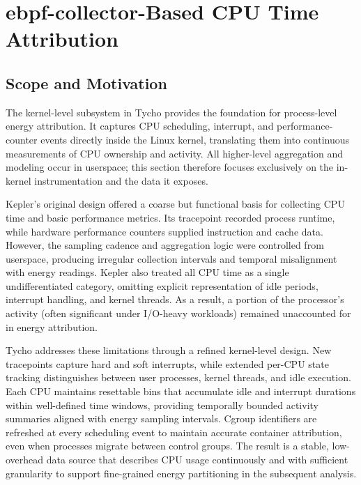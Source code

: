 \section{ebpf-collector-Based CPU Time Attribution}
\label{sec:ebpf-collector-architecture}

\subsection{Scope and Motivation}
\label{subsec:ebpf-collector-scope-motivation}

The kernel-level  subsystem in Tycho provides the foundation for process-level energy attribution.  
It captures CPU scheduling, interrupt, and performance-counter events directly inside the Linux kernel, translating them into continuous measurements of CPU ownership and activity.  
All higher-level aggregation and modeling occur in userspace; this section therefore focuses exclusively on the in-kernel instrumentation and the data it exposes.

Kepler’s original  design offered a coarse but functional basis for collecting CPU time and basic performance metrics.  
Its  tracepoint recorded process runtime, while hardware performance counters supplied instruction and cache data.  
However, the sampling cadence and aggregation logic were controlled from userspace, producing irregular collection intervals and temporal misalignment with energy readings.  
Kepler also treated all CPU time as a single undifferentiated category, omitting explicit representation of idle periods, interrupt handling, and kernel threads.  
As a result, a portion of the processor’s activity (often significant under I/O-heavy workloads) remained unaccounted for in energy attribution.

Tycho addresses these limitations through a refined kernel-level design.  
New tracepoints capture hard and soft interrupts, while extended per-CPU state tracking distinguishes between user processes, kernel threads, and idle execution.  
Each CPU maintains resettable bins that accumulate idle and interrupt durations within well-defined time windows, providing temporally bounded activity summaries aligned with energy sampling intervals.  
Cgroup identifiers are refreshed at every scheduling event to maintain accurate container attribution, even when processes migrate between control groups.  
The result is a stable, low-overhead data source that describes CPU usage continuously and with sufficient granularity to support fine-grained energy partitioning in the subsequent analysis.

